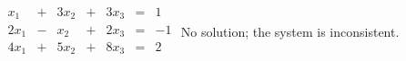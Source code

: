{$\begin{array}{KQKQJQJ}
x_1&+&3x_2&+&3x_3&=&1\\
2x_1&-&x_2&+&2x_3&=&-1\\
4x_1&+&5x_2&+&8x_3&=&2\\
\end{array}$}
{No solution; the system is inconsistent.}
